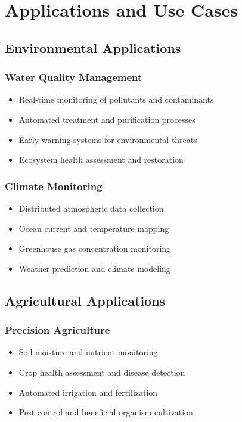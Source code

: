 \documentclass[11pt,a4paper]{article}
\begin{document}
\section{Applications and Use Cases}

\subsection{Environmental Applications}

\subsubsection{Water Quality Management}
\begin{itemize}
    \item Real-time monitoring of pollutants and contaminants
    \item Automated treatment and purification processes
    \item Early warning systems for environmental threats
    \item Ecosystem health assessment and restoration
\end{itemize}

\subsubsection{Climate Monitoring}
\begin{itemize}
    \item Distributed atmospheric data collection
    \item Ocean current and temperature mapping
    \item Greenhouse gas concentration monitoring
    \item Weather prediction and climate modeling
\end{itemize}

\subsection{Agricultural Applications}

\subsubsection{Precision Agriculture}
\begin{itemize}
    \item Soil moisture and nutrient monitoring
    \item Crop health assessment and disease detection
    \item Automated irrigation and fertilization
    \item Pest control and beneficial organism cultivation
\end{itemize}
\end{document}
